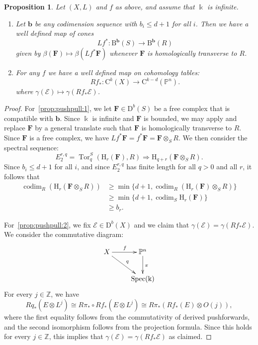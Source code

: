 \documentclass[12pt]{amsart}
\newtheorem{prop}[lemma]{Proposition}
\theoremstyle{definition}
\theoremstyle{remark}
\newcommand{\Spec}{\operatorname{Spec}}
\newcommand{\Tor}{\operatorname{Tor}}
\newcommand{\kk}{\Bbbk}
\newcommand{\codim}{\operatorname{codim}}
\newcommand{\PP}{\mathbb{P}}
\newcommand{\HH}{\mathrm{H}}
\newcommand{\ZZ}{\mathbb{Z}}
\newcommand{\bb}{\mathbf{b}}
\newcommand{\cE}{\mathcal{E}}
\newcommand{\FF}{\mathbf{F}}
\newcommand{\DD}{\mathrm{D}}
\newcommand{\CQ}{\mathrm{C}}
\newcommand{\BBQ}{\mathrm{B}}
\begin{document}
 \begin{prop}\label{prop:pushpull}
Let $(X,L)$ and $f$ as above, and assume that $\kk$ is infinite.
\begin{enumerate}
	\item\label{prop:pushpull:1} Let $\bb$ be any codimension sequence with $b_i\leq d+1$ for all $i$.   Then we have a well defined map of cones
	\[
Lf^*\colon \BBQ^{\bb}(S)\to \BBQ^{\bb}(R)
\]
given by $\beta(\FF)\mapsto \beta(Lf^*\FF)$ whenever $\FF$ is homologically transverse to $R$.  
	\item\label{prop:pushpull:2}	For any $f$ we have a well defined map on cohomology tables:
\[
Rf_*\colon \CQ^k(X)\to \CQ^{k-d}(\PP^n).
\]
where $\gamma(\cE)\mapsto \gamma(Rf_* \cE)$.  
\end{enumerate}
\end{prop}
\begin{proof}
For~\eqref{prop:pushpull:1}, we let $\FF\in \DD^b(S)$ be a free complex that is compatible with $\bb$.  Since $\kk$ is infinite and $\FF$ is bounded, we may apply \cite[Theorem]{miller-speyer} and replace $\FF$ by a general translate such that $\FF$ is homologically transverse to $R$.  Since $\FF$ is a free complex, we have $Lf^*\FF=f^*\FF=\FF\otimes_S R$.   We then consider the spectral sequence:
\[
E^{r,q}_2=\Tor^S_{q}(\HH_r(\FF),R)\Rightarrow \HH_{q+r}(\FF\otimes_S R).
\]
Since $b_i\leq d+1$ for all $i$, and since $E^{r,q}_2$ has finite length for all $q>0$ and all $r$, it follows that
\begin{align*}
\codim_R \left(\HH_{r}(\FF\otimes_S R)\right) &\geq \min\{d+1, \codim_R\left( \HH_r(\FF)\otimes_S R\right)\} \\
&\geq \min\{d+1, \codim_S \HH_r(\FF)\}\\
& \geq b_r.
\end{align*}


For~\eqref{prop:pushpull:2},  we fix $\cE\in \DD^b(X)$ and we claim that $\gamma(\cE)=\gamma(Rf_* \cE)$.  We consider the commutative diagram:
\[
\xymatrix{
X\ar[r]^f\ar[rd]^{q}& \PP^n\ar[d]^{\pi}\\
& \Spec(\kk)
}
\]
For every $j\in \ZZ$, we have
\[
Rq_*(E\otimes L^j)
\cong R\pi_* \circ Rf_* (E\otimes L^j)
\cong R\pi_* (  Rf_*(E) \otimes O(j) ),
\]
where the first equality follows from the commutativity of derived pushforwards, and the second isomorphism follows from the projection formula.  Since this holds for every $j\in \ZZ$, this implies that $\gamma(\cE)=\gamma(Rf_* \cE)$ as claimed.
\end{proof}
\end{document}
